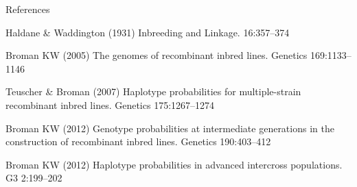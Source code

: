 \documentclass[aspectratio=169,12pt,t]{beamer}
\begin{document}
\begin{frame}[c]{References}

  \bbi

  \item Haldane \& Waddington (1931) Inbreeding and Linkage.
    16:357--374

  \item Broman KW (2005) The genomes of recombinant inbred lines. Genetics 169:1133--1146

  \item Teuscher \& Broman (2007) Haplotype probabilities for
    multiple-strain recombinant inbred lines. Genetics 175:1267--1274

  \item Broman KW (2012) Genotype probabilities at intermediate
    generations in the construction of recombinant inbred lines.
    Genetics 190:403--412

  \item Broman KW (2012) Haplotype probabilities in advanced
    intercross populations. G3 2:199--202

  \ei


\note{
}

\end{frame}
\end{document}
